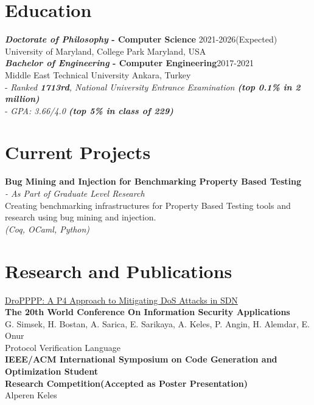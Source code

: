 \documentclass[letter]{res}
\newcommand{\secsplit}{\vspace{-2mm}}
\newcommand{\itemsplit}{\\[3mm]}
\begin{document}


\address{
  \texttt{
  \href{mailto:akeles@umd.edu}{akeles@umd.edu}} 
  \hspace{14.5cm} 
   \\
  \texttt{\href{https://github.com/alpaylan/}{github.com/alpaylan/}} \hfill
 \texttt{\href{https://www.linkedin.com/in/alpkeles/}{linkedin.com/in/alpkeles}}} 


\begin{resume}
\section{Education}
\secsplit
\textbf{{\sl Doctorate of Philosophy} - Computer Science} \hfill 2021-2026(Expected)\\
University of Maryland, College Park \hfill  Maryland, USA
\itemsplit
\textbf{{\sl Bachelor of Engineering} - Computer Engineering}\hfill 2017-2021\\
Middle East Technical University \hfill  Ankara, Turkey\\
{- \sl Ranked \textbf{1713rd}, National University Entrance Examination \textbf{(top 0.1\% in 2 million)}} \\
{- \sl GPA: 3.66/4.0 \textbf{(top 5\% in class of 229)}}
\secsplit
\section{Current Projects}
\secsplit
\textbf{Bug Mining and Injection for Benchmarking Property Based Testing}\\
{\sl - As Part of Graduate Level Research}\\
Creating benchmarking infrastructures for Property Based Testing tools and research using bug mining and injection.\\
\textit{(Coq, OCaml, Python)}
\secsplit
\section{Research and Publications}
\secsplit
{\href{https://link.springer.com/chapter/10.1007\%2F978-3-030-39303-8_5}{DroPPPP: A P4 Approach to Mitigating DoS Attacks in SDN}}\\
\textbf{The 20th World Conference On Information Security Applications} \\
G. Simsek, H. Bostan, A. Sarica, E. Sarikaya, A. Keles, P. Angin, H. Alemdar, E. Onur
\itemsplit
{Protocol Verification Language}\\
\textbf{IEEE/ACM International Symposium on Code Generation and Optimization Student \\ Research Competition(Accepted as Poster Presentation)}\\
Alperen Keles
\secsplit

\end{resume}
\end{document}
